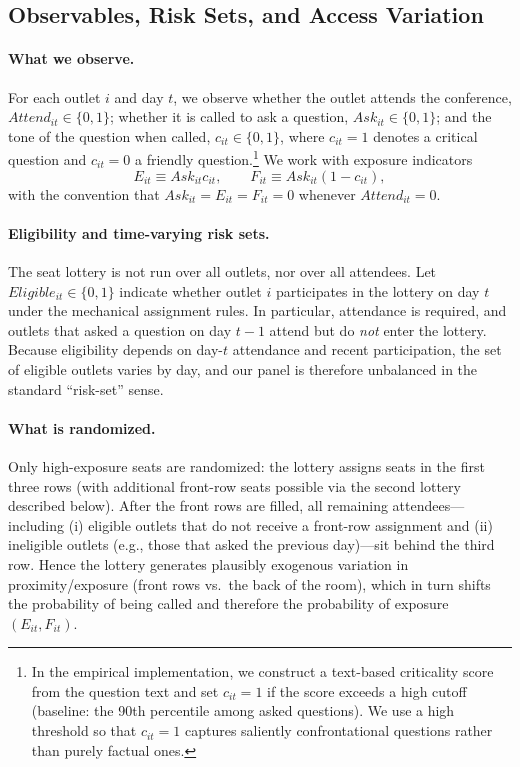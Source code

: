 \documentclass[12pt]{article}
\begin{document}
\subsection{Observables, Risk Sets, and Access Variation}

\paragraph{What we observe.}
For each outlet $i$ and day $t$, we observe whether the outlet attends the conference, $Attend_{it}\in\{0,1\}$; whether it is called to ask a question, $Ask_{it}\in\{0,1\}$; and the tone of the question when called, $c_{it}\in\{0,1\}$, where $c_{it}=1$ denotes a critical question and $c_{it}=0$ a friendly question.\footnote{In the empirical implementation, we construct a text-based criticality score from the question text and set $c_{it}=1$ if the score exceeds a high cutoff (baseline: the 90th percentile among asked questions). We use a high threshold so that $c_{it}=1$ captures saliently confrontational questions rather than purely factual ones.} We work with exposure indicators
\[
E_{it}\equiv Ask_{it}c_{it},
\qquad
F_{it}\equiv Ask_{it}(1-c_{it}),
\]
with the convention that $Ask_{it}=E_{it}=F_{it}=0$ whenever $Attend_{it}=0$.

\paragraph{Eligibility and time-varying risk sets.}
The seat lottery is not run over all outlets, nor over all attendees. Let $Eligible_{it}\in\{0,1\}$ indicate whether outlet $i$ participates in the lottery on day $t$ under the mechanical assignment rules. In particular, attendance is required, and outlets that asked a question on day $t\!-\!1$ attend but do \emph{not} enter the lottery. Because eligibility depends on day-$t$ attendance and recent participation, the set of eligible outlets varies by day, and our panel is therefore unbalanced in the standard ``risk-set'' sense.

\paragraph{What is randomized.}
Only high-exposure seats are randomized: the lottery assigns seats in the first three rows (with additional front-row seats possible via the second lottery described below). After the front rows are filled, all remaining attendees---including (i) eligible outlets that do not receive a front-row assignment and (ii) ineligible outlets (e.g., those that asked the previous day)---sit behind the third row. Hence the lottery generates plausibly exogenous variation in proximity/exposure (front rows vs.\ the back of the room), which in turn shifts the probability of being called and therefore the probability of exposure $(E_{it},F_{it})$.
\end{document}
